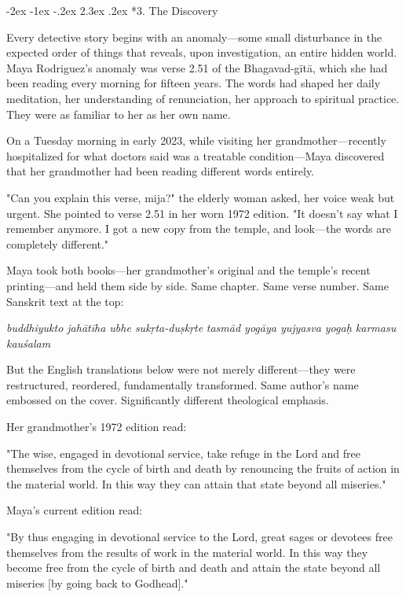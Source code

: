 \documentclass[12pt,twoside]{book}
\makeatletter
\def\cleardoublepage{\clearpage\if@twoside \ifodd\c@page\else\hbox{}\thispagestyle{empty}\newpage\if@twocolumn\hbox{}\newpage\fi\fi\fi}
\renewcommand\section{\@startsection{section}{1}{\z@}%
{-2ex \@plus -1ex \@minus -.2ex}%
{2.3ex \@plus.2ex}%
{\normalfont\Large\bfseries}}
\makeatother
\begin{document}
\cleardoublepage
\vspace*{0.20\textheight}
\section*{3. The Discovery}
\thispagestyle{chapterpage}

\normalfont\justifying
Every detective story begins with an anomaly—some small disturbance in the expected order of things that reveals, upon investigation, an entire hidden world. Maya Rodriguez's anomaly was verse 2.51 of the Bhagavad-gītā, which she had been reading every morning for fifteen years. The words had shaped her daily meditation, her understanding of renunciation, her approach to spiritual practice. They were as familiar to her as her own name.

On a Tuesday morning in early 2023, while visiting her grandmother—recently hospitalized for what doctors said was a treatable condition—Maya discovered that her grandmother had been reading different words entirely.

"Can you explain this verse, mija?" the elderly woman asked, her voice weak but urgent. She pointed to verse 2.51 in her worn 1972 edition. "It doesn't say what I remember anymore. I got a new copy from the temple, and look—the words are completely different."

Maya took both books—her grandmother's original and the temple's recent printing—and held them side by side. Same chapter. Same verse number. Same Sanskrit text at the top:

\emph{buddhiyukto jahātīha ubhe sukṛta-duṣkṛte}
\emph{tasmād yogāya yujyasva yogaḥ karmasu kauśalam}

But the English translations below were not merely different—they were restructured, reordered, fundamentally transformed. Same author's name embossed on the cover. Significantly different theological emphasis.

Her grandmother's 1972 edition read:

"The wise, engaged in devotional service, take refuge in the Lord and free themselves from the cycle of birth and death by renouncing the fruits of action in the material world. In this way they can attain that state beyond all miseries."

Maya's current edition read:

"By thus engaging in devotional service to the Lord, great sages or devotees free themselves from the results of work in the material world. In this way they become free from the cycle of birth and death and attain the state beyond all miseries [by going back to Godhead]."
\end{document}
